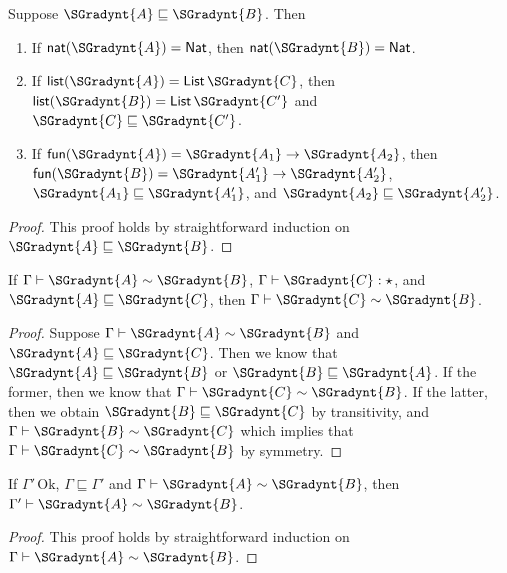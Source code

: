 \begin{lemma}
  \label{lemma:fun_type_pre}
  Suppose $ \SGradynt{A}  \sqsubseteq  \SGradynt{B} $.  Then
  \begin{enumerate}[label=\roman*.,align=left]    
  \item If $ \mathsf{nat}( \SGradynt{A} ) =   \mathsf{Nat}  $, then $ \mathsf{nat}( \SGradynt{B} ) =   \mathsf{Nat}  $.    
  \item If $ \mathsf{list}( \SGradynt{A} ) =   \mathsf{List}\, \SGradynt{C}  $, then $ \mathsf{list}( \SGradynt{B} ) =   \mathsf{List}\, \SGradynt{C'}  $ and $ \SGradynt{C}  \sqsubseteq  \SGradynt{C'} $.
  \item If $ \mathsf{fun}( \SGradynt{A} ) =  \SGradynt{A_{{\mathrm{1}}}}  \rightarrow  \SGradynt{A_{{\mathrm{2}}}} $, then $ \mathsf{fun}( \SGradynt{B} ) =  \SGradynt{A'_{{\mathrm{1}}}}  \rightarrow  \SGradynt{A'_{{\mathrm{2}}}} $, $ \SGradynt{A_{{\mathrm{1}}}}  \sqsubseteq  \SGradynt{A'_{{\mathrm{1}}}} $, and $ \SGradynt{A_{{\mathrm{2}}}}  \sqsubseteq  \SGradynt{A'_{{\mathrm{2}}}} $.
  \end{enumerate}
\end{lemma}
\begin{proof}
  This proof holds by straightforward induction on $ \SGradynt{A}  \sqsubseteq  \SGradynt{B} $.
\end{proof}

\begin{lemma}
  \label{lemma:type_cons_type_pre_2}
  If $ \Gamma  \vdash  \SGradynt{A}  \sim  \SGradynt{B} $, $ \Gamma  \vdash  \SGradynt{C}  : \star $, and $ \SGradynt{A}  \sqsubseteq  \SGradynt{C} $, then $ \Gamma  \vdash  \SGradynt{C}  \sim  \SGradynt{B} $.
\end{lemma}
\begin{proof}
  Suppose $ \Gamma  \vdash  \SGradynt{A}  \sim  \SGradynt{B} $ and $ \SGradynt{A}  \sqsubseteq  \SGradynt{C} $.  Then we know
  that $ \SGradynt{A}  \sqsubseteq  \SGradynt{B} $ or $ \SGradynt{B}  \sqsubseteq  \SGradynt{A} $.  If the former, then
  we know that $ \Gamma  \vdash  \SGradynt{C}  \sim  \SGradynt{B} $.  If the latter, then
  we obtain $ \SGradynt{B}  \sqsubseteq  \SGradynt{C} $ by transitivity, and $ \Gamma  \vdash  \SGradynt{B}  \sim  \SGradynt{C} $
  which implies that $ \Gamma  \vdash  \SGradynt{C}  \sim  \SGradynt{B} $ by symmetry.
\end{proof}

\begin{lemma}
  \label{lemma:type_cons_ctx_pre}
  If $ \Gamma' \,\text{Ok} $, $ \Gamma  \sqsubseteq  \Gamma' $ and $ \Gamma  \vdash  \SGradynt{A}  \sim  \SGradynt{B} $, then $ \Gamma'  \vdash  \SGradynt{A}  \sim  \SGradynt{B} $.
\end{lemma}
\begin{proof}
  This proof holds by straightforward induction on $ \Gamma  \vdash  \SGradynt{A}  \sim  \SGradynt{B} $. 
\end{proof}

